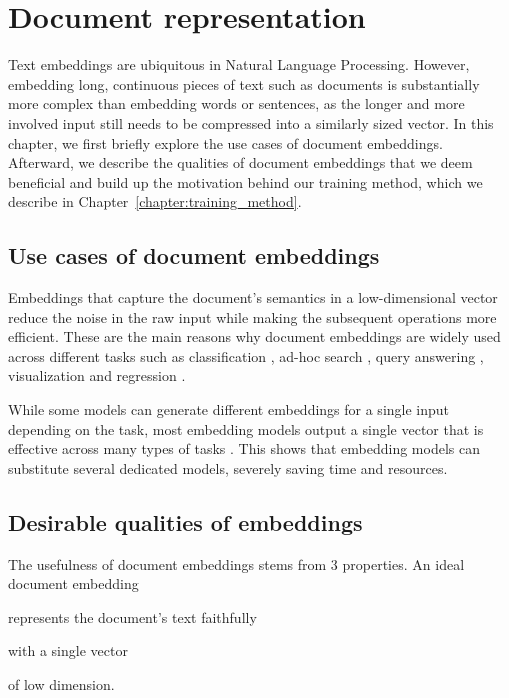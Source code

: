 \chapter{Document representation}\label{chapter:document_representation}

Text embeddings are ubiquitous in Natural Language Processing. However,
embedding long, continuous pieces of text such as documents is substantially
more complex than embedding words or sentences, as the longer and more involved
input still needs to be compressed into a similarly sized vector. In this
chapter, we first briefly explore the use cases of document embeddings.
Afterward, we describe the qualities of document embeddings that we deem
beneficial and build up the motivation behind our training method, which we
describe in Chapter~\ref{chapter:training_method}.

\section{Use cases of document embeddings}

Embeddings that capture the document's semantics in a low-dimensional vector
reduce the noise in the raw input while making the subsequent operations more
efficient. These are the main reasons why document embeddings are widely used
across different tasks such as classification \citep{cohan2020specter,
neelakantan2022text, izacard2021unsupervised, ostendorff2022neighborhood},
ad-hoc search \citep{singh2022scirepeval, zamani2018neural}, query answering
\citep{neelakantan2022text}, visualization \citep{cohan2020specter,
dai2015document} and regression \citep{singh2022scirepeval}.

While some models \citep{singh2022scirepeval} can generate different embeddings
for a single input depending on the task, most embedding models output a single
vector that is effective across many types of tasks \citep{neelakantan2022text,
cohan2020specter, ostendorff2022neighborhood}. This shows that embedding models
can substitute several dedicated models, severely saving time and resources.

\section{Desirable qualities of embeddings}

The usefulness of document embeddings stems from 3 properties. An ideal
document embedding
\begin{enumerate*}[label=(\arabic*)]
  \item represents the document's text faithfully
  \item with a single vector
  \item of low dimension.
\end{enumerate*}


